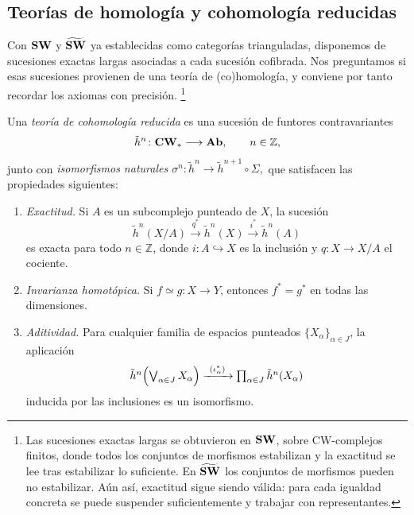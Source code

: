 \subsection{Teorías de homología y cohomología reducidas}

Con $\mathbf{SW}$ y $\widetilde{\mathbf{SW}}$ ya establecidas como categorías trianguladas, disponemos de sucesiones exactas largas asociadas a cada sucesión cofibrada. Nos preguntamos si esas sucesiones provienen de una teoría de (co)homología, y conviene por tanto recordar los axiomas con precisión.%
\footnote{
    Las sucesiones exactas largas se obtuvieron en $\mathbf{SW}$, sobre CW-complejos finitos, donde todos los conjuntos de morfismos estabilizan y la exactitud se lee tras estabilizar lo suficiente. En $\widetilde{\mathbf{SW}}$ los conjuntos de morfismos pueden no estabilizar. Aún así, exactitud sigue siendo válida: para cada igualdad concreta se puede suspender suficientemente y trabajar con representantes.
}


\begin{defi}\label{defi:cohomologia-reducida}
Una \emph{teoría de cohomología reducida} es una sucesión de funtores contravariantes
\[
\tilde h^n\colon\mathbf{CW}_*\longrightarrow\mathbf{Ab},
\qquad n\in\mathbb Z,
\]
junto con \emph{isomorfismos naturales
$\sigma^n\colon\tilde h^n\longrightarrow\tilde h^{n+1}\circ\Sigma,$}
que satisfacen las propiedades siguientes:
\begin{enumerate}[label = \textup{\arabic*.}]
\item \emph{Exactitud.} Si $A$ es un subcomplejo punteado de $X$, la sucesión
\[
\tilde h^n(X/A)\xrightarrow{\ q^*\ }\tilde h^n(X)\xrightarrow{\ i^*\ }\tilde h^n(A)
\]
es exacta para todo $n\in\mathbb Z$, donde $i\colon A\hookrightarrow X$ es la inclusión y $q\colon X\to X/A$ el cociente.

\item \emph{Invarianza homotópica.} Si $f\simeq g\colon X\to Y$, entonces $f^*=g^*$ en todas las dimensiones.

\item \emph{Aditividad.} Para cualquier familia de espacios punteados $\{X_\alpha\}_{\alpha\in J}$, la aplicación
\[\textstyle
\tilde h^n\Bigl(\bigvee_{\alpha\in J}X_\alpha\Bigr)\xrightarrow{\ (\iota_\alpha^*)\ }\prod_{\alpha\in J}\tilde h^n(X_\alpha)
\]
inducida por las inclusiones es un isomorfismo.
\end{enumerate}
\end{defi}

